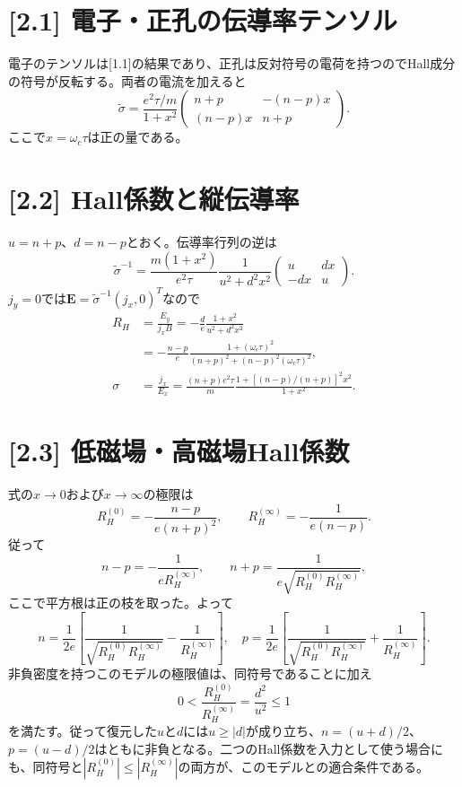 \documentclass[11pt,a4paper]{article}
\begin{document}
\section*{[2.1] 電子・正孔の伝導率テンソル}
電子のテンソルは[1.1]の結果であり、正孔は反対符号の電荷を持つのでHall成分の符号が反転する。両者の電流を加えると
\begin{equation}
 \boxed{\widetilde{\sigma}=\frac{e^2\tau/m}{1+x^2}
 \begin{pmatrix}n+p&-(n-p)x\\(n-p)x&n+p\end{pmatrix}}.
\end{equation}
ここで$x=\omega_c\tau$は正の量である。

\section*{[2.2] Hall係数と縦伝導率}
$u=n+p$、$d=n-p$とおく。伝導率行列の逆は
\begin{equation}
 \widetilde{\sigma}^{-1}=\frac{m(1+x^2)}{e^2\tau}
 \frac{1}{u^2+d^2x^2}
 \begin{pmatrix}u&dx\\-dx&u\end{pmatrix}.
\end{equation}
$j_y=0$では$\boldsymbol E=\widetilde{\sigma}^{-1}(j_x,0)^T$なので
\begin{align}
 R_H&=\frac{E_y}{j_xB}
 =-\frac{d}{e}\frac{1+x^2}{u^2+d^2x^2}\\
 &=\boxed{-\frac{n-p}{e}\frac{1+(\omega_c\tau)^2}{(n+p)^2+(n-p)^2(\omega_c\tau)^2}},\\
 \sigma&=\frac{j_x}{E_x}
 =\boxed{\frac{(n+p)e^2\tau}{m}
 \frac{1+[(n-p)/(n+p)]^2x^2}{1+x^2}}.
\end{align}

\section*{[2.3] 低磁場・高磁場Hall係数}
式の$x\to0$および$x\to\infty$の極限は
\begin{equation}
 R_H^{(0)}=-\frac{n-p}{e(n+p)^2},\qquad
 R_H^{(\infty)}=-\frac{1}{e(n-p)}.
\end{equation}
従って
\begin{equation}
 n-p=-\frac{1}{eR_H^{(\infty)}},\qquad
 n+p=\frac{1}{e\sqrt{R_H^{(0)}R_H^{(\infty)}}},
\end{equation}
ここで平方根は正の枝を取った。よって
\begin{equation}
 \boxed{n=\frac{1}{2e}\left[\frac{1}{\sqrt{R_H^{(0)}R_H^{(\infty)}}}-\frac{1}{R_H^{(\infty)}}\right]},\quad
 \boxed{p=\frac{1}{2e}\left[\frac{1}{\sqrt{R_H^{(0)}R_H^{(\infty)}}}+\frac{1}{R_H^{(\infty)}}\right]}.
\end{equation}
非負密度を持つこのモデルの極限値は、同符号であることに加え
\begin{equation}
 0<\frac{R_H^{(0)}}{R_H^{(\infty)}}
 =\frac{d^2}{u^2}\le1
\end{equation}
を満たす。従って復元した$u$と$d$には$u\ge|d|$が成り立ち、$n=(u+d)/2$、$p=(u-d)/2$はともに非負となる。二つのHall係数を入力として使う場合にも、同符号と$|R_H^{(0)}|\le|R_H^{(\infty)}|$の両方が、このモデルとの適合条件である。
\end{document}
